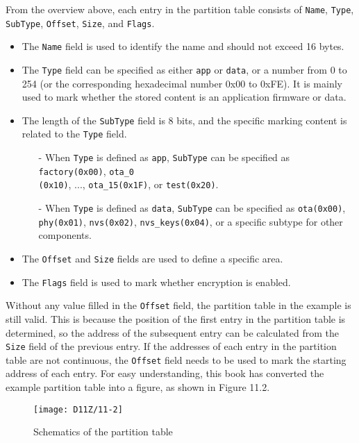 \documentclass[a4paper,12pt]{book}
\begin{document}
From the overview above, each entry in the partition table consists of \verb|Name|, \verb|Type|, \verb|SubType|, \verb|Offset|, \verb|Size|, and \verb|Flags|.

\begin{itemize}[leftmargin=1em]
    \item The \verb|Name| field is used to identify the name and should not exceed 16 bytes.
    \item The \verb|Type| field can be specified as either \verb|app| or \verb|data|, or a number from 0 to 254 (or the corresponding hexadecimal number 0x00 to 0xFE). It is mainly used to mark whether the stored content is an application firmware or data.
    \item The length of the \verb|SubType| field is 8 bits, and the specific marking content is related to the \verb|Type| field.
    \begin{itemize}[leftmargin=1em]
        \item[-] When \verb|Type| is defined as \verb|app|, \verb|SubType| can be specified as \verb|factory(0x00)|, \verb|ota_0|\\ \verb|(0x10)|, ..., \verb|ota_15(0x1F)|, or \verb|test(0x20)|.
        \item[-] When \verb|Type| is defined as \verb|data|, \verb|SubType| can be specified as \verb|ota(0x00)|, \verb|phy(0x01)|, \verb|nvs(0x02)|, \verb|nvs_keys(0x04)|, or a specific subtype for other components.
    \end{itemize}
    \item The \verb|Offset| and \verb|Size| fields are used to define a specific area.
    \item The \verb|Flags| field is used to mark whether encryption is enabled.
\end{itemize}

Without any value filled in the \verb|Offset| field, the partition table in the example is still valid. This is because the position of the first entry in the partition table is determined, so the address of the subsequent entry can be calculated from the \verb|Size| field of the previous entry. If the addresses of each entry in the partition table are not continuous, the \verb|Offset| field needs to be used to mark the starting address of each entry. For easy understanding, this book has converted the example partition table into a figure, as shown in Figure 11.2.

\begin{figure}[!h]
    \centering
    \texttt{[image: D11Z/11-2]}
    \caption{Schematics of the partition table}
\end{figure}
\end{document}
